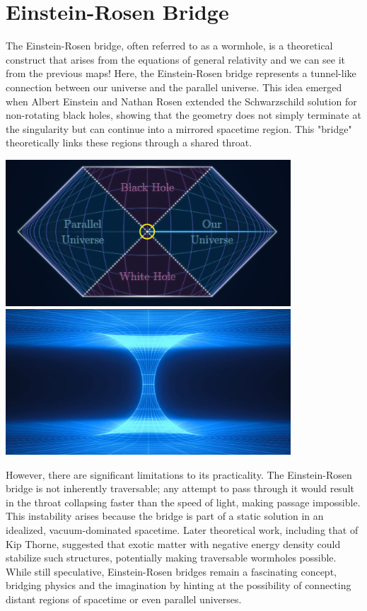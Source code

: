 \documentclass[12pt,a4paper]{article}
\begin{document}
\section{Einstein-Rosen Bridge}
The Einstein-Rosen bridge, often referred to as a wormhole, is a theoretical construct that arises from the equations of general relativity and we can see it from the previous maps! Here, the Einstein-Rosen bridge represents a tunnel-like connection between our universe and the parallel universe. This idea emerged when Albert Einstein and Nathan Rosen extended the Schwarzschild solution for non-rotating black holes, showing that the geometry does not simply terminate at the singularity but can continue into a mirrored spacetime region. This "bridge" theoretically links these regions through a shared throat.
\begin{center}
    \includegraphics[width=0.8\textwidth]{bridge_map.png}
    \includegraphics[width=0.8\textwidth]{einsten_rosen_bridge.png}    
\end{center}

However, there are significant limitations to its practicality. The Einstein-Rosen bridge is not inherently traversable; any attempt to pass through it would result in the throat collapsing faster than the speed of light, making passage impossible. This instability arises because the bridge is part of a static solution in an idealized, vacuum-dominated spacetime. Later theoretical work, including that of Kip Thorne, suggested that exotic matter with negative energy density could stabilize such structures, potentially making traversable wormholes possible. While still speculative, Einstein-Rosen bridges remain a fascinating concept, bridging physics and the imagination by hinting at the possibility of connecting distant regions of spacetime or even parallel universes.
\end{document}
